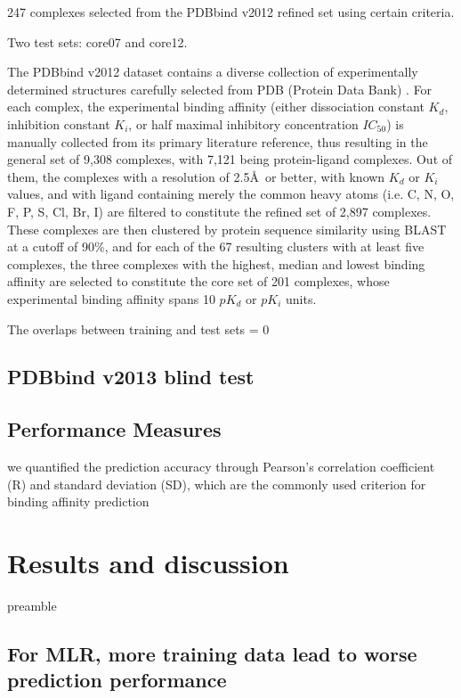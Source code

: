\documentclass[journal=jacsat,manuscript=article]{achemso}
\begin{document}
247 complexes selected from the PDBbind v2012 refined set using certain criteria.

Two test sets: core07 and core12.

The PDBbind v2012 dataset contains a diverse collection of experimentally determined structures carefully selected from PDB (Protein Data Bank) \cite{540,537}. For each complex, the experimental binding affinity (either dissociation constant $K_d$, inhibition constant $K_i$, or half maximal inhibitory concentration $IC_{50}$) is manually collected from its primary literature reference, thus resulting in the general set of 9,308 complexes, with 7,121 being protein-ligand complexes. Out of them, the complexes with a resolution of 2.5\AA\ or better, with known $K_d$ or $K_i$ values, and with ligand containing merely the common heavy atoms (i.e. C, N, O, F, P, S, Cl, Br, I) are filtered to constitute the refined set of 2,897 complexes. These complexes are then clustered by protein sequence similarity using BLAST at a cutoff of 90\%, and for each of the 67 resulting clusters with at least five complexes, the three complexes with the highest, median and lowest binding affinity are selected to constitute the core set of 201 complexes, whose experimental binding affinity spans 10 $pK_d$ or $pK_i$ units.

The overlaps between training and test sets = 0

\subsection{PDBbind v2013 blind test}

\subsection{Performance Measures}

we quantified the prediction accuracy through Pearson's correlation coefficient (R) and standard deviation (SD), which are the commonly used criterion for binding affinity prediction

\section{Results and discussion}

preamble

\subsection{For MLR, more training data lead to worse prediction performance}
\end{document}

